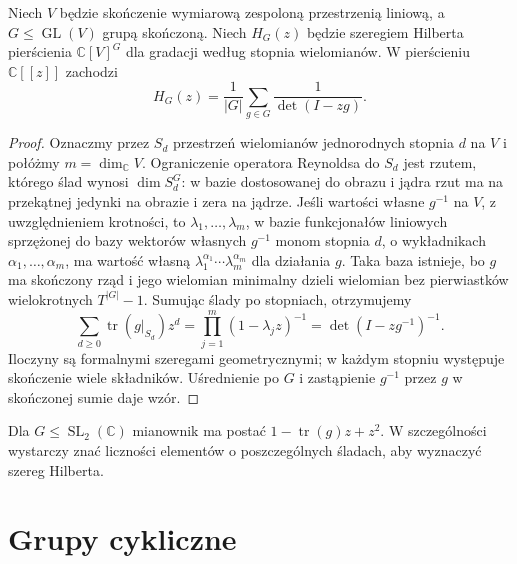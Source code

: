 \begin{twierdzenie}
\label{aa:tw:molien}
Niech $V$ będzie skończenie wymiarową zespoloną
przestrzenią liniową, a $G\le\operatorname{GL}(V)$
grupą skończoną. Niech $H_G(z)$ będzie szeregiem
Hilberta pierścienia $\mathbb C[V]^G$ dla gradacji
według stopnia wielomianów. W pierścieniu
$\mathbb C[[z]]$ zachodzi
\[
 H_G(z)=\frac{1}{|G|}\sum_{g\in G}
 \frac{1}{\det(I-zg)}.
\]
\end{twierdzenie}
\begin{proof}
Oznaczmy przez $S_d$ przestrzeń wielomianów
jednorodnych stopnia $d$ na $V$ i połóżmy
$m=\dim_{\mathbb C}V$. Ograniczenie operatora Reynoldsa
do $S_d$ jest rzutem, którego ślad wynosi $\dim S_d^G$:
w bazie dostosowanej do obrazu i jądra rzut ma na
przekątnej jedynki na obrazie i zera na jądrze.
Jeśli wartości własne $g^{-1}$ na $V$, z uwzględnieniem
krotności, to $\lambda_1,\ldots,\lambda_m$,
w bazie funkcjonałów liniowych sprzężonej do bazy
wektorów własnych $g^{-1}$ monom stopnia $d$,
o wykładnikach $\alpha_1,\ldots,\alpha_m$,
ma wartość własną $\lambda_1^{\alpha_1}
\cdots\lambda_m^{\alpha_m}$ dla działania $g$.
Taka baza istnieje, bo $g$ ma skończony rząd
i jego wielomian minimalny dzieli wielomian bez
pierwiastków wielokrotnych $T^{|G|}-1$.
Sumując ślady po stopniach, otrzymujemy
\[
 \sum_{d\ge0}\operatorname{tr}(g|_{S_d})z^d
 =\prod_{j=1}^m(1-\lambda_jz)^{-1}
 =\det(I-zg^{-1})^{-1}.
\]
Iloczyny są formalnymi szeregami geometrycznymi;
w każdym stopniu występuje skończenie wiele składników.
Uśrednienie po $G$ i zastąpienie $g^{-1}$ przez $g$
w skończonej sumie daje wzór.
\end{proof}

Dla $G\le\operatorname{SL}_2(\mathbb C)$ mianownik
ma postać $1-\operatorname{tr}(g)z+z^2$.
W szczególności wystarczy znać liczności elementów
o poszczególnych śladach, aby wyznaczyć szereg Hilberta.

\section{Grupy cykliczne}

